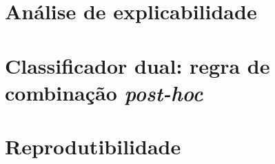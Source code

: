 \section{An\'alise de explicabilidade}
\label{sec:analise_explicabilidade}

%

\section{Classificador dual: regra de combina\c{c}\~ao \emph{post-hoc}}
\label{sec:dual}

%

\section{Reprodutibilidade}
\label{sec:reprodutibilidade}

%
